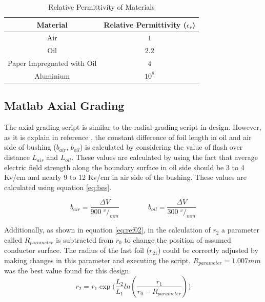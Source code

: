 

\begin{table}[!htb]
\begin{center}
\begin{tabular}{cc}
\toprule
\textbf{Material} & \textbf{Relative Permittivity ($\epsilon_r$)} \\ \toprule
Air & $1$ \\
Oil &$ 2.2$ \\
Paper Impregnated with Oil &$ 4$ \\
Aluminium & $10^8$\\
\bottomrule
\end{tabular}
\end{center}
\caption{Relative Permittivity of Materials}
\label{table:perm}
\end{table}

\subsection{Matlab Axial Grading}
The axial grading script is similar to the radial grading script in design. 
However, as it is explain in reference \cite{David1}, the constant difference of foil length in oil and air side of bushing ($b_{air}$, $b_{oil}$) is calculated by considering the value of flash over distance $L_{air}$ and $L_{oil}$. 
These values are calculated by using the fact that average electric field strength along the boundary surface in oil side should be 3 to 4 Kv/cm and nearly 9 to 12 Kv/cm  in air side of the bushing. 
These values are calculated using equation \ref{eq:bes}. 
 
\begin{equation}
\label{eq:bes}
 b_{air} = \displaystyle \frac{  \Delta V}{900 \;^v/_{mm}} \qquad \qquad
 b_{oil} = \displaystyle \frac{  \Delta V}{300 \;^v/_{mm}}
\end{equation}

Additionally, as shown in equation \ref{eq:ref02}, in the calculation of $r_2$ a parameter called $R_{parameter}$ is subtracted from $r_0$  to change the position of assumed conductor surface. 
The radius of the last foil ($r_{21}$) could be correctly adjusted by making changes in this parameter and executing the script. $R_{parameter}=1.007mm$ was the best value found for this design.
\begin{equation}
  \label{eq:ref02}
  \displaystyle r_2= \displaystyle  r_{1} \displaystyle \exp\big( \displaystyle  \frac{L_2}{L_{1}}ln(\displaystyle \frac{r_1}{r_0-R_{parameter}})\big) 
\end{equation}

